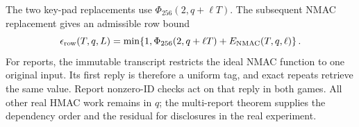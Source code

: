 The two key-pad replacements use $\Phi_{256}(2,q+\ell T)$. The subsequent
NMAC replacement gives an admissible row bound
\[
 \epsilon_{\rm row}(T,q,L)
 =\min\!\left\{1,
 \Phi_{256}(2,q+\ell T)+E_{\rm NMAC}(T,q,\ell)\right\}.
\]
For reports, the immutable transcript restricts the ideal NMAC function
to one original input. Its first reply is therefore a uniform tag, and
exact repeats retrieve the same value.
Report nonzero-ID checks act on that reply in both games. All other real
HMAC work remains in $q$; the multi-report theorem supplies the dependency
order and the residual for disclosures in the real experiment.
